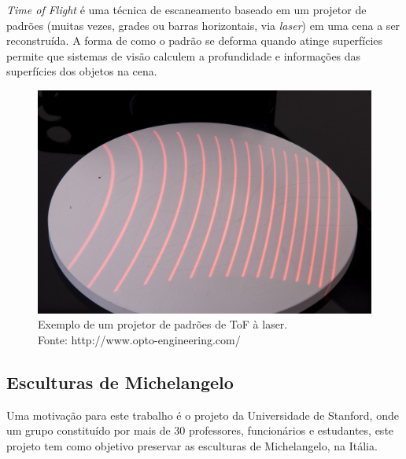 \documentclass[table, usenames, svgnames, xcolor=dvipsnames]{beamer}
\begin{document}
\begin{frame}
	\begin{center}
		\emph{Time of Flight} é uma técnica de escaneamento baseado em um projetor de padrões (muitas vezes, grades ou barras horizontais, via \emph{laser}) em uma cena a ser reconstruída. A forma de como o padrão se deforma quando atinge superfícies permite que sistemas de visão calculem a profundidade e informações das superfícies dos objetos na cena.
	\end{center}
\end{frame}

\begin{frame}
	\begin{figure}
		\begin{center}
		\centering
		\includegraphics[width=0.7\linewidth]{figs/luzestruturada.jpg}
		\caption{Exemplo de um projetor de padrões de ToF à laser. \\
		\tiny{Fonte: http://www.opto-engineering.com/}
		}
	\end{center}
\end{figure}	 

\end{frame}

\subsection{Esculturas de Michelangelo}

\begin{frame} 
	\begin{center}
		Uma motivação para este trabalho é o projeto da Universidade de Stanford, onde um grupo constituído por mais de 30 professores, funcionários e estudantes, este projeto tem como objetivo preservar as esculturas de Michelangelo, na Itália.
	\end{center}
\end{frame}
\end{document}
